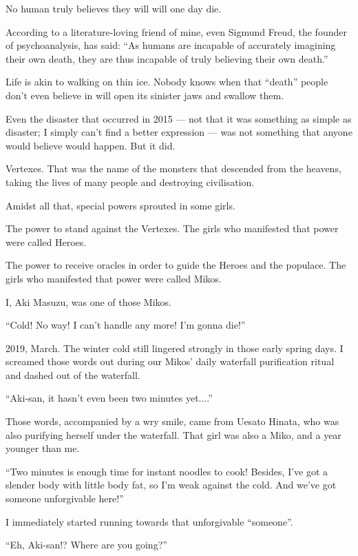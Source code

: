 

No human truly believes they will will one day die.

According to a literature-loving friend of mine, even Sigmund Freud, the founder of psychoanalysis, has said: ``As humans are incapable of accurately imagining their own death, they are thus incapable of truly believing their own death.''

Life is akin to walking on thin ice. Nobody knows when that ``death'' people don't even believe in will open its sinister jaws and swallow them.

Even the disaster that occurred in 2015 --- not that it was something as simple as disaster; I simply can't find a better expression --- was not something that anyone would believe would happen. But it did.

Vertexes. That was the name of the monsters that descended from the heavens, taking the lives of many people and destroying civilisation.

Amidst all that, special powers sprouted in some girls.

The power to stand against the Vertexes. The girls who manifested that power were called Heroes.

The power to receive oracles in order to guide the Heroes and the populace. The girls who manifested that power were called Mikos.

I, Aki Masuzu, was one of those Mikos.

``Cold! No way! I can't handle any more! I'm gonna die!''

2019, March. The winter cold still lingered strongly in those early spring days. I screamed those words out during our Mikos' daily waterfall purification ritual and dashed out of the waterfall.

``Aki-san, it hasn't even been two minutes yet....''

Those words, accompanied by a wry smile, came from Uesato Hinata, who was also purifying herself under the waterfall. That girl was also a Miko, and a year younger than me.

``Two minutes is enough time for instant noodles to cook! Besides, I've got a slender body with little body fat, so I'm weak against the cold. And we've got someone unforgivable here!''

I immediately started running towards that unforgivable ``someone''.

``Eh, Aki-san!? Where are you going?''

